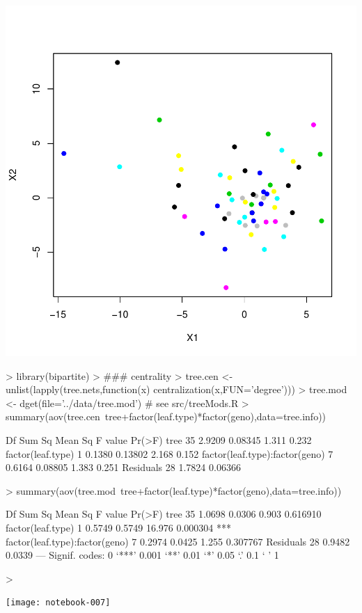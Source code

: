 \documentclass[12pt]{article}
\begin{document}
\includegraphics{notebook-006}

\begin{Schunk}
\begin{Sinput}
> library(bipartite)
> ### centrality
> tree.cen <- unlist(lapply(tree.nets,function(x) centralization(x,FUN='degree')))
> tree.mod <- dget(file='../data/tree.mod') # see src/treeMods.R
> summary(aov(tree.cen~tree+factor(leaf.type)*factor(geno),data=tree.info))
\end{Sinput}
\begin{Soutput}
                               Df Sum Sq Mean Sq F value Pr(>F)
tree                           35 2.9209 0.08345   1.311  0.232
factor(leaf.type)               1 0.1380 0.13802   2.168  0.152
factor(leaf.type):factor(geno)  7 0.6164 0.08805   1.383  0.251
Residuals                      28 1.7824 0.06366               
\end{Soutput}
\begin{Sinput}
> summary(aov(tree.mod~tree+factor(leaf.type)*factor(geno),data=tree.info))
\end{Sinput}
\begin{Soutput}
                               Df Sum Sq Mean Sq F value   Pr(>F)    
tree                           35 1.0698  0.0306   0.903 0.616910    
factor(leaf.type)               1 0.5749  0.5749  16.976 0.000304 ***
factor(leaf.type):factor(geno)  7 0.2974  0.0425   1.255 0.307767    
Residuals                      28 0.9482  0.0339                     
---
Signif. codes:  0 ‘***’ 0.001 ‘**’ 0.01 ‘*’ 0.05 ‘.’ 0.1 ‘ ’ 1
\end{Soutput}
\begin{Sinput}
> 
\end{Sinput}
\end{Schunk}
\texttt{[image: notebook-007]}
\end{document}
